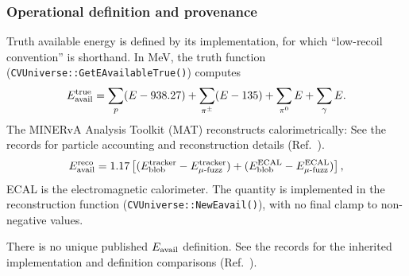 \subsubsection{Operational definition and provenance}
\label{sec:3d-method}
\label{sec:eavail-definition}
Truth available energy is defined by its implementation, for which ``low-recoil convention'' is shorthand. In MeV, the truth function (\texttt{CVUniverse::GetEAvailableTrue()}) computes
\begin{equation}
 E_{\rm avail}^{\rm true}=
 \sum_{p}(E-938.27)
 +\sum_{\pi^\pm}(E-135)
 +\sum_{\pi^0}E
 +\sum_{\gamma}E .
 \label{eq:eavail-implemented}
\end{equation}
The MINERvA Analysis Toolkit (MAT) reconstructs calorimetrically: See the records for particle accounting and reconstruction details (Ref.~\cite{NoteRecords2026}).
\begin{equation}
 E_{\rm avail}^{\rm reco}=1.17\left[(E_{\rm blob}^{\rm tracker}
 -E_{\mu\text{-fuzz}}^{\rm tracker})+(E_{\rm blob}^{\rm ECAL}
 -E_{\mu\text{-fuzz}}^{\rm ECAL})\right],
 \label{eq:eavail-reco-implemented}
\end{equation}
ECAL is the electromagnetic calorimeter. The quantity is implemented in the reconstruction function (\texttt{CVUniverse::NewEavail()}), with no final clamp to non-negative values.

There is no unique published $E_{\rm avail}$ definition. See the records for the inherited implementation and definition comparisons (Ref.~\cite{NoteRecords2026}).

